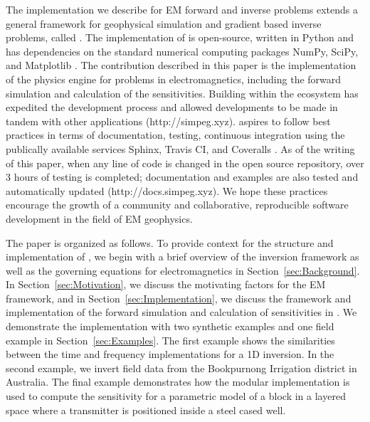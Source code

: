 The implementation we describe for EM forward and inverse problems extends a
general framework for geophysical simulation and gradient based inverse
problems, called \SimPEG \citep{Cockett2015}. The implementation of \SimPEG is
open-source, written in Python and has dependencies on the standard numerical
computing packages NumPy, SciPy, and Matplotlib \citep{numpy, scipy,
matplotlib}. The contribution described in this paper is the implementation of
the physics engine for problems in electromagnetics, including the forward
simulation and calculation of the sensitivities. Building within the \SimPEG
ecosystem has expedited the development process and allowed developments to be
made in tandem with other applications (http://simpeg.xyz). \simpegEM aspires
to follow best practices in terms of documentation, testing, continuous
integration using the publically available services Sphinx, Travis CI, and
Coveralls \citep{Sphinx, Travis, Coveralls}. As of the writing of this paper,
when any line of code is changed in the open source repository, over 3 hours
of testing is completed; documentation and examples are also tested and
automatically updated (http://docs.simpeg.xyz). We hope these practices
encourage the growth of a community and collaborative, reproducible software
development in the field of EM geophysics.

\bigskip

The paper is organized as follows. To provide context for the structure and
implementation of \simpegEM, we begin with a brief overview of the \SimPEG
inversion framework as well as the governing equations for electromagnetics in
Section~\ref{sec:Background}. In Section~\ref{sec:Motivation}, we discuss the
motivating factors for the EM framework, and in
Section~\ref{sec:Implementation}, we discuss the framework and implementation
of the forward simulation and calculation of sensitivities in \simpegEM. We
demonstrate the implementation with two synthetic examples and one field
example in Section~\ref{sec:Examples}. The first example shows the
similarities between the time and frequency implementations for a 1D
inversion. In the second example, we invert field data from the Bookpurnong
Irrigation district in Australia. The final example demonstrates how the
modular implementation is used to compute the sensitivity for a parametric
model of a block in a layered space where a transmitter is positioned inside a
steel cased well.



